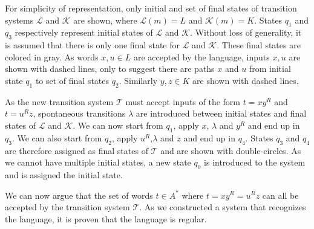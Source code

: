 For simplicity of representation, only initial and set of final states of transition systems $\mathcal{L}$ and $\mathcal{K}$ are shown, where $\mathcal{L}(m)=L$ and $\mathcal{K}(m)=K$.
States $q_1$ and $q_3$ respectively represent initial states of $\mathcal{L}$ and $\mathcal{K}$.
Without loss of generality, it is assumed that there is only one final state for $\mathcal{L}$ and $\mathcal{K}$.
These final states are colored in gray.
As words $x,u \in L$ are accepted by the language, inputs $x,u$ are shown with dashed lines, only to suggest there are paths $x$ and $u$ from initial state $q_1$ to set of final states $q_2$.
Similarly $y,z \in K$ are shown with dashed lines.

As the new transition system $\mathcal{T}$ must accept inputs of the form $t = xy^R$ and $t = u^Rz$, spontaneous transitions $\lambda$ are introduced between initial states and final states of $\mathcal{L}$ and $\mathcal{K}$.
We can now start from $q_1$, apply $x$, $\lambda$ and $y^R$ and end up in $q_3$.
We can also start from $q_2$, apply $u^R$,$\lambda$ and $z$ and end up in $q_4$.
States $q_3$ and $q_4$ are therefore assigned as final states of $\mathcal{T}$ and are shown with double-circles.
As we cannot have multiple initial states, a new state $q_0$ is introduced to the system and is assigned the initial state.

We can now argue that the set of words $t \in A^*$ where $t = xy^R = u^Rz$ can all be accepted by the transition system $\mathcal{T}$.
As we constructed a system that recognizes the language, it is proven that the language is regular.

